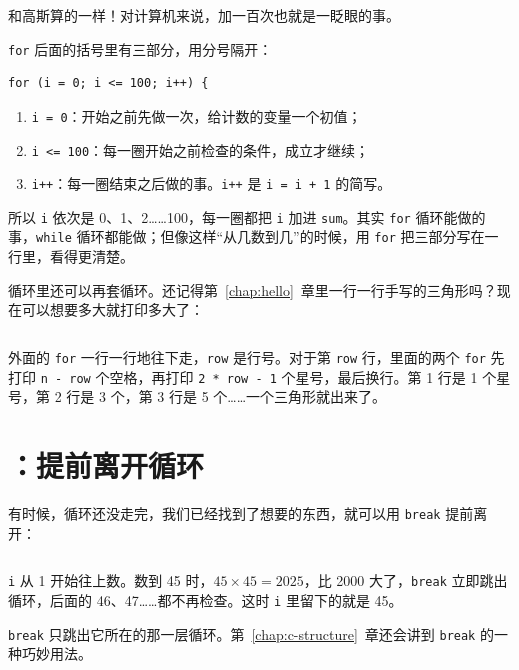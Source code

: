 和高斯算的一样！对计算机来说，加一百次也就是一眨眼的事。

\texttt{for} 后面的括号里有三部分，用分号隔开：
\begin{verbatim}
for (i = 0; i <= 100; i++) {
\end{verbatim}
\begin{enumerate}
  \item \texttt{i = 0}：开始之前先做一次，给计数的变量一个初值；
  \item \texttt{i <= 100}：每一圈开始之前检查的条件，成立才继续；
  \item \texttt{i++}：每一圈结束之后做的事。\texttt{i++} 是 \texttt{i = i + 1} 的简写。
\end{enumerate}
所以 \texttt{i} 依次是 0、1、2……100，每一圈都把 \texttt{i} 加进 \texttt{sum}。其实 \texttt{for} 循环能做的事，\texttt{while} 循环都能做；但像这样“从几数到几”的时候，用 \texttt{for} 把三部分写在一行里，看得更清楚。

循环里还可以再套循环。还记得第~\ref{chap:hello}~章里一行一行手写的三角形吗？现在可以想要多大就打印多大了：


\inputminted[linenos=false]{text}{code/ch02/out/triangle.txt}

外面的 \texttt{for} 一行一行地往下走，\texttt{row} 是行号。对于第 \texttt{row} 行，里面的两个 \texttt{for} 先打印 \texttt{n - row} 个空格，再打印 \texttt{2 * row - 1} 个星号，最后换行。第 1 行是 1 个星号，第 2 行是 3 个，第 3 行是 5 个……一个三角形就出来了。

\section{\texorpdfstring{}{break}：提前离开循环}
\label{sec:break}

有时候，循环还没走完，我们已经找到了想要的东西，就可以用 \texttt{break} 提前离开：


\inputminted[linenos=false]{text}{code/ch02/out/first_square.txt}

\texttt{i} 从 1 开始往上数。数到 45 时，$45 \times 45 = 2025$，比 2000 大了，\texttt{break} 立即跳出循环，后面的 46、47……都不再检查。这时 \texttt{i} 里留下的就是 45。

\texttt{break} 只跳出它所在的那一层循环。第~\ref{chap:c-structure}~章还会讲到 \texttt{break} 的一种巧妙用法。

